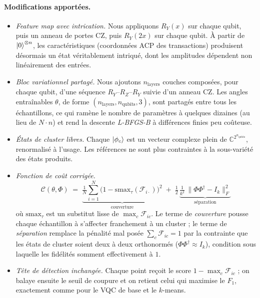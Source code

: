 \documentclass[a4paper]{article}
\begin{document}
\paragraph{Modifications apportées.}
\begin{itemize}
    \item \emph{Feature map avec intrication.} Nous appliquons $R_Y(x)$ sur chaque qubit, puis un anneau de portes $\mathrm{CZ}$, puis $R_Y(2x)$ sur chaque qubit. À partir de $\ket{0}^{\otimes n}$, les caractéristiques (coordonnées ACP des transactions) produisent désormais un état véritablement intriqué, dont les amplitudes dépendent non linéairement des entrées.
    \item \emph{Bloc variationnel partagé.} Nous ajoutons $n_{\text{layers}}$ couches composées, pour chaque qubit, d'une séquence $R_Y$–$R_Z$–$R_Y$ suivie d'un anneau $\mathrm{CZ}$. Les angles entraînables $\theta$, de forme $(n_{\text{layers}}, n_{\text{qubits}}, 3)$, sont partagés entre tous les échantillons, ce qui ramène le nombre de paramètres à quelques dizaines (au lieu de $N\cdot n$) et rend la descente \emph{L-BFGS-B} à différences finies peu coûteuse.
    \item \emph{États de cluster libres.} Chaque $\ket{\phi_c}$ est un vecteur complexe plein de $\mathbb{C}^{2^{n_{\text{qubits}}}}$, renormalisé à l'usage. Les références ne sont plus contraintes à la sous-variété des états produits.
    \item \emph{Fonction de coût corrigée.}
    \[
    \mathcal{C}(\theta, \Phi) \;=\; \underbrace{\tfrac{1}{N}\sum_{i=1}^{N}\bigl(1 - \mathrm{smax}_\tau(\mathcal{F}_{i\cdot})\bigr)^2}_{\text{couverture}}
    \;+\; \tfrac{1}{2}\,\underbrace{\tfrac{1}{k^2}\,\bigl\|\Phi\Phi^\dagger - I_k\bigr\|_F^2}_{\text{séparation}}
    \]
    où $\mathrm{smax}_\tau$ est un substitut lisse de $\max_c \mathcal{F}_{ic}$. Le terme de \emph{couverture} pousse chaque échantillon à s'affecter franchement à un cluster ; le terme de \emph{séparation} remplace la pénalité mal posée $\sum_c \mathcal{F}_{ic} = 1$ par la contrainte que les états de cluster soient deux à deux orthonormés ($\Phi\Phi^\dagger \approx I_k$), condition sous laquelle les fidélités somment effectivement à $1$.
    \item \emph{Tête de détection inchangée.} Chaque point reçoit le score $1 - \max_c \mathcal{F}_{ic}$ ; on balaye ensuite le seuil de coupure et on retient celui qui maximise le $F_1$, exactement comme pour le VQC de base et le $k$-means.
\end{itemize}
\end{document}
